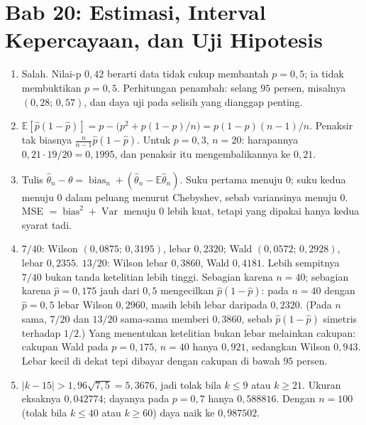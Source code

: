 \section*{Bab 20: Estimasi, Interval Kepercayaan, dan Uji Hipotesis}
\begin{enumerate}[label=\textbf{20.\arabic*}]
  \item Salah. Nilai-p $0{,}42$ berarti data tidak cukup membantah $p=0{,}5$; ia tidak
        membuktikan $p=0{,}5$. Perhitungan penambah: selang $95$ persen, misalnya
        $(0{,}28;\,0{,}57)$, dan daya uji pada selisih yang dianggap penting.

  \item $\mathbb{E}[\hat p(1-\hat p)]=p-\bigl(p^{2}+p(1-p)/n\bigr)
        =p(1-p)(n-1)/n$. Penaksir tak biasnya
        $\frac{n}{n-1}\hat p(1-\hat p)$. Untuk $p=0{,}3$, $n=20$: harapannya
        $0{,}21\cdot19/20=0{,}1995$, dan penaksir itu mengembalikannya ke $0{,}21$.

  \item Tulis $\hat\theta_{n}-\theta=\operatorname{bias}_{n}
        +(\hat\theta_{n}-\mathbb{E}\hat\theta_{n})$. Suku pertama menuju $0$; suku
        kedua menuju $0$ dalam peluang menurut Chebyshev, sebab variansinya menuju
        $0$. MSE $=\operatorname{bias}^{2}+\operatorname{Var}$ menuju $0$ lebih kuat,
        tetapi yang dipakai hanya kedua syarat tadi.

  \item 
$7/40$: Wilson $(0{,}0875;\,0{,}3195)$, lebar $0{,}2320$; Wald
        $(0{,}0572;\,0{,}2928)$, lebar $0{,}2355$. $13/20$: Wilson lebar $0{,}3860$,
        Wald $0{,}4181$. Lebih sempitnya $7/40$ bukan tanda ketelitian lebih tinggi. Sebagian
        karena $n=40$; sebagian karena $\hat p=0{,}175$ jauh dari $0{,}5$
        mengecilkan $\hat p(1-\hat p)$: pada $n=40$ dengan $\hat p=0{,}5$ lebar
        Wilson $0{,}2960$, masih lebih lebar daripada $0{,}2320$. (Pada $n$ sama,
        $7/20$ dan $13/20$ sama-sama memberi $0{,}3860$, sebab $\hat p(1-\hat p)$
        simetris terhadap $1/2$.) Yang menentukan ketelitian bukan lebar melainkan
        cakupan: cakupan Wald pada $p=0{,}175$, $n=40$ hanya $0{,}921$, sedangkan
        Wilson $0{,}943$. Lebar kecil di dekat tepi dibayar dengan cakupan di
        bawah $95$ persen.

  \item $|k-15|>1{,}96\sqrt{7{,}5}=5{,}3676$, jadi tolak bila $k\le9$ atau $k\ge21$.
        Ukuran eksaknya $0{,}042774$; dayanya pada $p=0{,}7$ hanya $0{,}588816$.
        Dengan $n=100$ (tolak bila $k\le40$ atau $k\ge60$) daya naik ke $0{,}987502$.


\end{enumerate}
